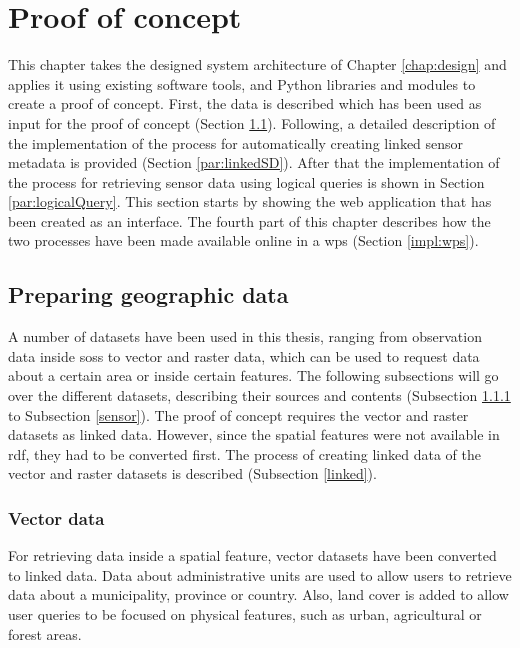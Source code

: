 \chapter{Proof of concept}
\label{chap:impl}
This chapter takes the designed system architecture of Chapter \ref{chap:design} and applies it using existing software tools, and Python libraries and modules to create a proof of concept. First, the data is described which has been used as input for the proof of concept (Section \ref{chap:data}). Following, a detailed description of the implementation of the process for automatically creating linked sensor metadata is provided (Section \ref{par:linkedSD}). After that the implementation of the process for retrieving sensor data using logical queries is shown in Section \ref{par:logicalQuery}. This section starts by showing the web application that has been created as an interface. The fourth part of this chapter describes how the two processes have been made available online in a \acf{wps} (Section \ref{impl:wps}). 

\section{Preparing geographic data}
\label{chap:data}

A number of datasets have been used in this thesis, ranging from observation data inside \aclp{sos} to vector and raster data, which can be used to request data about a certain area or inside certain features. The following subsections will go over the different datasets, describing their sources and contents (Subsection \ref{vector} to Subsection \ref{sensor}). The proof of concept requires the vector and raster datasets as linked data. However, since the spatial features were not available in \ac{rdf}, they had to be converted first. The process of creating linked data of the vector and raster datasets is described (Subsection \ref{linked}).  

\subsection{Vector data}
\label{vector}
For retrieving data inside a spatial feature, vector datasets have been converted to linked data. Data about administrative units are used to allow users to retrieve data about a municipality, province or country. Also, land cover is added to allow user queries to be focused on physical features, such as urban, agricultural or forest areas.   


